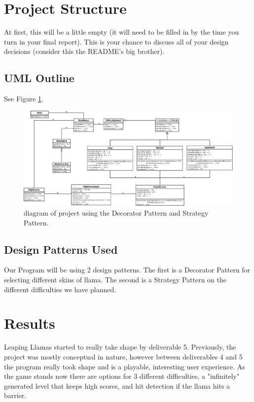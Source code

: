 \documentclass[10pt,conference,onecolumn,compsoc]{IEEEtran}
\begin{document}
\section{Project Structure}
At first, this will be a little empty (it will need to be filled in by the time you turn in your final report).  This is your chance to discuss all of your design decisions (consider this the README's big brother).

\subsection{UML Outline}
See Figure \ref{dia}.

\begin{figure}[ht!]
\includegraphics[scale=0.25]{LeapingLlamas.png}
\caption{diagram of project using the Decorator Pattern and Strategy Pattern.}
\label{dia}
\end{figure}


\subsection{Design Patterns Used}
Our Program will be using 2 design patterns. The first is a Decorator Pattern for selecting different skins of llama. The second is a Strategy Pattern on the different difficulties we have planned.

\section{Results}
Leaping Llamas started to really take shape by deliverable 5. Previously, the project was mostly conceptual in nature, however between deliverables 4 and 5 the program really took shape and is a playable, interesting user experience. As the game stands now there are options for 3 different difficulties, a "infinitely" generated level that keeps high scores, and hit detection if the llama hits a barrier.
\end{document}
